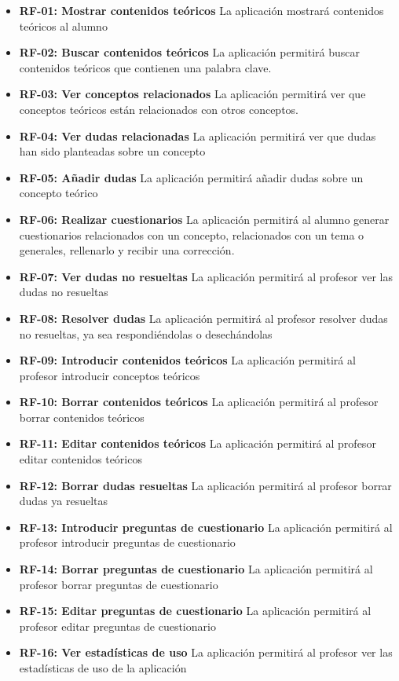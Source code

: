 \documentclass[openright,twoside,10pt]{book}
\begin{document}
    \begin{itemize}
    \item
      \textbf{RF-01: Mostrar contenidos teóricos} La aplicación mostrará
      contenidos teóricos al alumno
    \item
      \textbf{RF-02: Buscar contenidos teóricos} La aplicación permitirá
      buscar contenidos teóricos que contienen una palabra clave.
    \item
      \textbf{RF-03: Ver conceptos relacionados} La aplicación permitirá ver
      que conceptos teóricos están relacionados con otros conceptos.
    \item
      \textbf{RF-04: Ver dudas relacionadas} La aplicación permitirá ver que
      dudas han sido planteadas sobre un concepto
    \item
      \textbf{RF-05: Añadir dudas} La aplicación permitirá añadir dudas
      sobre un concepto teórico
    \item
      \textbf{RF-06: Realizar cuestionarios} La aplicación permitirá al
      alumno generar cuestionarios relacionados con un concepto,
      relacionados con un tema o generales, rellenarlo y recibir una
      corrección.
    \item
      \textbf{RF-07: Ver dudas no resueltas} La aplicación permitirá al
      profesor ver las dudas no resueltas
    \item
      \textbf{RF-08: Resolver dudas} La aplicación permitirá al profesor
      resolver dudas no resueltas, ya sea respondiéndolas o desechándolas
    \item
      \textbf{RF-09: Introducir contenidos teóricos} La aplicación permitirá
      al profesor introducir conceptos teóricos
    \item
      \textbf{RF-10: Borrar contenidos teóricos} La aplicación permitirá al
      profesor borrar contenidos teóricos
    \item
      \textbf{RF-11: Editar contenidos teóricos} La aplicación permitirá al
      profesor editar contenidos teóricos
    \item
      \textbf{RF-12: Borrar dudas resueltas} La aplicación permitirá al
      profesor borrar dudas ya resueltas
    \item
      \textbf{RF-13: Introducir preguntas de cuestionario} La aplicación
      permitirá al profesor introducir preguntas de cuestionario
    \item
      \textbf{RF-14: Borrar preguntas de cuestionario} La aplicación
      permitirá al profesor borrar preguntas de cuestionario
    \item
      \textbf{RF-15: Editar preguntas de cuestionario} La aplicación
      permitirá al profesor editar preguntas de cuestionario
    \item
      \textbf{RF-16: Ver estadísticas de uso} La aplicación permitirá al
      profesor ver las estadísticas de uso de la aplicación
    \end{itemize}
    
\end{document}
